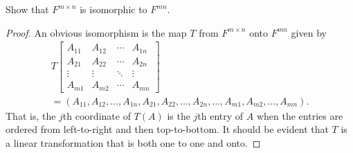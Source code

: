  Show that $F^{m\times n}$ is isomorphic to $F^{mn}$.
\begin{proof}
  An obvious isomorphism is the map $T$ from $F^{m\times n}$ onto
  $F^{mn}$ given by
  \begin{multline*}
    T
    \begin{bmatrix}
      A_{11} & A_{12} & \cdots & A_{1n} \\
      A_{21} & A_{22} & \cdots & A_{2n} \\
      \vdots & \vdots & \ddots & \vdots \\
      A_{m1} & A_{m2} & \cdots & A_{mn}
    \end{bmatrix} \\
    =
    (A_{11},A_{12},\dots,A_{1n},A_{21},A_{22},\dots,A_{2n},\dots,
    A_{m1},A_{m2},\dots,A_{mn}).
  \end{multline*}
  That is, the $j$th coordinate of $T(A)$ is the $j$th entry of $A$
  when the entries are ordered from left-to-right and then
  top-to-bottom. It should be evident that $T$ is a linear
  transformation that is both one to one and onto.
\end{proof}

